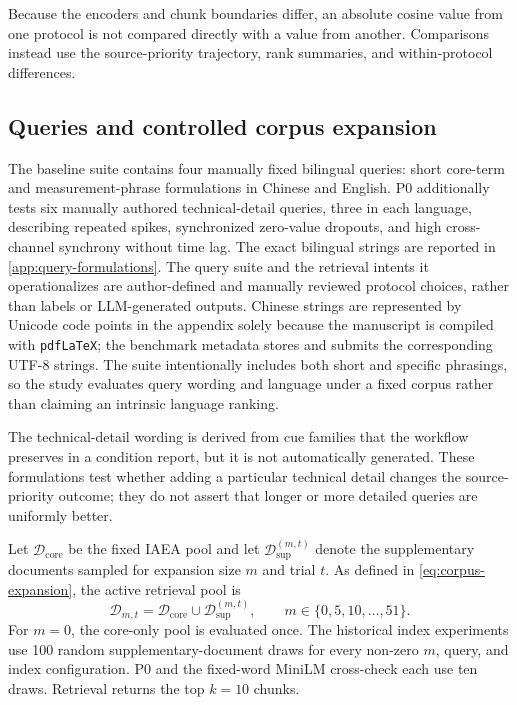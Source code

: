 Because the encoders and chunk boundaries differ, an absolute cosine value from one protocol is not compared directly with a value from another. Comparisons instead use the source-priority trajectory, rank summaries, and within-protocol differences.

\subsection{Queries and controlled corpus expansion}
The baseline suite contains four manually fixed bilingual queries: short core-term and measurement-phrase formulations in Chinese and English. P0 additionally tests six manually authored technical-detail queries, three in each language, describing repeated spikes, synchronized zero-value dropouts, and high cross-channel synchrony without time lag. The exact bilingual strings are reported in \cref{app:query-formulations}. The query suite and the retrieval intents it operationalizes are author-defined and manually reviewed protocol choices, rather than labels or LLM-generated outputs. Chinese strings are represented by Unicode code points in the appendix solely because the manuscript is compiled with \texttt{pdfLaTeX}; the benchmark metadata stores and submits the corresponding UTF-8 strings. The suite intentionally includes both short and specific phrasings, so the study evaluates query wording and language under a fixed corpus rather than claiming an intrinsic language ranking.

The technical-detail wording is derived from cue families that the workflow preserves in a condition report, but it is not automatically generated. These formulations test whether adding a particular technical detail changes the source-priority outcome; they do not assert that longer or more detailed queries are uniformly better.

Let $\mathcal{D}_{\mathrm{core}}$ be the fixed IAEA pool and let $\mathcal{D}_{\mathrm{sup}}^{(m,t)}$ denote the supplementary documents sampled for expansion size $m$ and trial $t$. As defined in \cref{eq:corpus-expansion}, the active retrieval pool is
\begin{equation}
\mathcal{D}_{m,t}=\mathcal{D}_{\mathrm{core}}\cup\mathcal{D}_{\mathrm{sup}}^{(m,t)}, \qquad
m\in\{0,5,10,\ldots,51\}.
\label{eq:corpus-expansion}
\end{equation}
For $m=0$, the core-only pool is evaluated once. The historical index experiments use 100 random supplementary-document draws for every non-zero $m$, query, and index configuration. P0 and the fixed-word MiniLM cross-check each use ten draws. Retrieval returns the top $k=10$ chunks.

